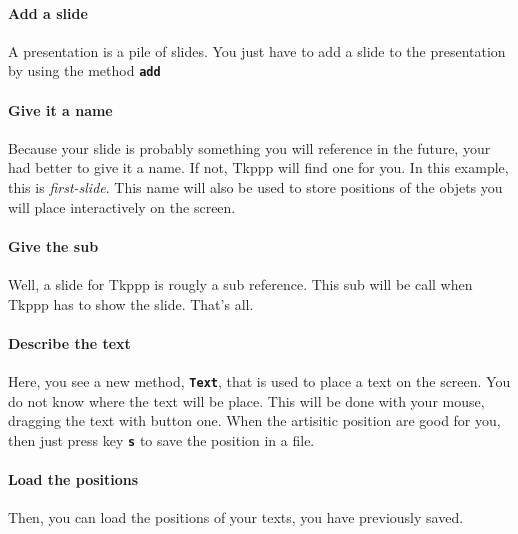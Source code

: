 \documentclass{article}
\begin{document}
\paragraph{Add a slide}
A presentation is a pile of slides. You just have to add
a slide to the presentation by using the method \texttt{\bf add}

\paragraph{Give it a name}
Because your slide is probably something you will reference in the
future, your had better to give it a name. If not, Tkppp will find one
for you. In this example, this is {\it first-slide}. This name will also
be used to store positions of the objets you will place interactively
on the screen.

\paragraph{Give the sub}
Well, a slide for Tkppp is rougly a sub reference. This sub will be call 
when Tkppp has to show the slide. That's all.

\paragraph{Describe the text} Here, you see a new method,
\texttt{\bf Text}, that is used to place a text on the screen. You do not
know where the text will be place. This will be done with your mouse,
dragging the text with button one. When the artisitic position are
good for you, then just press key \texttt{\bf s} to save the position 
in a file.

\paragraph{Load the positions} Then, you can load the positions of your
texts, you have previously saved.


\newpage
\end{document}

